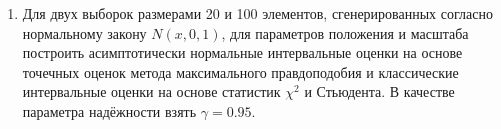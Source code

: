 \documentclass[main.tex]{subfiles}
\begin{document}
\begin{enumerate}
	\item Для двух выборок размерами 20 и 100 элементов, сгенерированных согласно нормальному закону $N(x,0,1)$, для параметров положения и масштаба построить асимптотически нормальные интервальные оценки на основе точечных оценок метода максимального правдоподобия и классические интервальные оценки на основе статистик $\chi^2$ и Стьюдента. В качестве параметра надёжности взять $\gamma = 0.95$.
\end{enumerate}

\newpage
\end{document}
